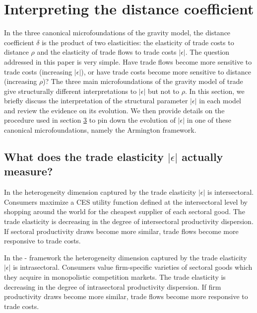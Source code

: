 \documentclass[12pt,twoside,a4paper,notitlepage]{article}
\begin{document}
\clearpage

\section{ Interpreting the distance coefficient}
In the three canonical microfoundations of the gravity model, the distance coefficient $\delta $ is the product of two elasticities: the elasticity of trade costs to distance $ \rho $ and the elasticity of trade flows to trade costs $ |\epsilon| $.
The question addressed in this paper is very simple.
Have trade flows become more sensitive to trade costs (increasing $ |\epsilon| $), or have trade costs become more sensitive to distance (increasing $\rho$)? 
The three main microfoundations of the gravity model of trade give structurally different interpretations to $ |\epsilon| $ but not to $ \rho $. 
In this section, we briefly discuss the interpretation of the structural parameter $ |\epsilon| $ in each model and review the evidence on its evolution. 
We then provide details on the procedure used in section {\hyperref[ref-003]{3}} to pin down the evolution of $ |\epsilon| $ in one of these canonical microfoundations, namely the Armington framework. 

\subsection{What does the trade elasticity $ |\epsilon| $ actually measure? \label{mark-1.1.}}

In \cite{Eaton2002} the heterogeneity dimension captured by the trade elasticity $ |\epsilon| $ is intersectoral.
Consumers maximize a CES utility function defined at the intersectoral level by shopping around the world for the cheapest supplier of each sectoral good. 
The trade elasticity is decreasing in the degree of intersectoral productivity dispersion.
If sectoral productivity draws become more similar, trade flows become more responsive to trade costs.

In the \cite{Melitz2003}-\cite{Chaney2008} framework the heterogeneity dimension captured by the trade elasticity $ |\epsilon| $ is intrasectoral.
Consumers value firm-specific varieties of sectoral goods which they acquire in monopolistic competition markets.
The trade elasticity is decreasing in the degree of intrasectoral productivity dispersion.
If firm productivity draws become more similar, trade flows become more responsive to trade costs.
\end{document}
